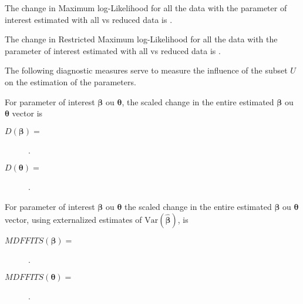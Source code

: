\documentclass[english]{article}
\begin{document}
\begin{multicols*}{2}
\begin{definitionNOHFILLsub}
The change in Maximum log-Likelihood for all the data with the parameter of interest \lfbox[conditions]{$\bm{\psi}$} estimated with all vs reduced data is .
\end{definitionNOHFILLsub}

\begin{definitionNOHFILLsub}
The change in Restricted Maximum log-Likelihood for all the data with the parameter of interest \lfbox[conditions]{$\bm{\psi}$} estimated with all vs reduced data is .
\end{definitionNOHFILLsub}

\bigskip

The following diagnostic measures serve to measure the influence of the subset $U$ on the estimation of the parameters.
\begin{definitionNOHFILLsub}[Cook's $D$]
For parameter of interest $\bm{\beta}$ ou $\bm{\theta}$, the scaled change in the entire estimated $\bm{\beta}$ ou $\bm{\theta}$ vector is
\begin{description}
	\item[$D(\bm{\beta}) =$]	.
	\item[$D(\bm{\theta}) =$]	.
\end{description}
\end{definitionNOHFILLsub}

\begin{definitionNOHFILLsub}
For parameter of interest $\bm{\beta}$ ou $\bm{\theta}$ the scaled change in the entire estimated $\bm{\beta}$ ou $\bm{\theta}$ vector, using externalized estimates of $\text{Var}(\hat{\bm{\beta}})$, is
\begin{description}
	\item[$MDFFITS(\bm{\beta}) =$]	.
	\item[$MDFFITS(\bm{\theta}) =$]	.
\end{description}
\end{definitionNOHFILLsub}


\end{multicols*}
\end{document}

